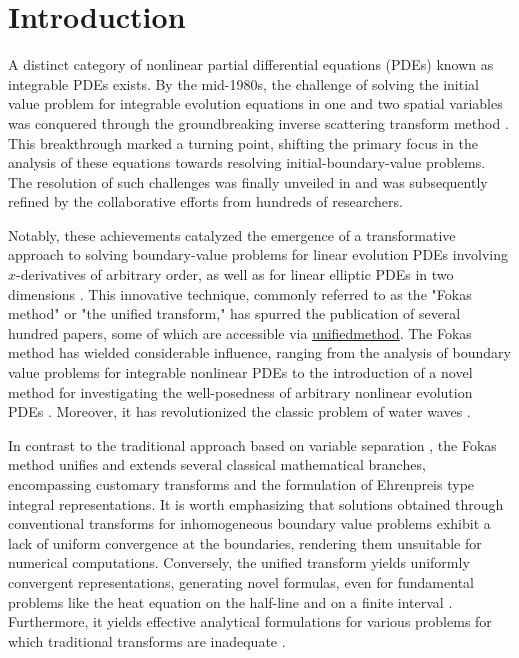 \documentclass[12pt]{article}
\numberwithin{equation}{section}
\begin{document}
\section{Introduction}
A distinct category of nonlinear partial differential equations (PDEs) known as integrable PDEs exists. By the mid-1980s, the challenge of solving the initial value problem for integrable evolution equations in one and two spatial variables was conquered through the groundbreaking inverse scattering transform method \cite{ablowitz1974inverse}. This breakthrough marked a turning point, shifting the primary focus in the analysis of these equations towards resolving initial-boundary-value problems. The resolution of such challenges was finally unveiled in \cite{fokas1997unified} and was subsequently refined by the collaborative efforts from hundreds of researchers.

Notably, these achievements catalyzed the emergence of a transformative approach to solving boundary-value problems for linear evolution PDEs involving $x$-derivatives of arbitrary order, as well as for linear elliptic PDEs in two dimensions \cite{fokas2001two,fokas2016unified}. This innovative technique, commonly referred to as the "Fokas method" or "the unified transform," has spurred the publication of several hundred papers, some of which are accessible via \href{http://www.unifiedmethod.azurewebsites.net}{unifiedmethod}. The Fokas method has wielded considerable influence, ranging from the analysis of boundary value problems for integrable nonlinear PDEs \cite{fokas2005nonlinear,spence2010new} to the introduction of a novel method for investigating the well-posedness of arbitrary nonlinear evolution PDEs \cite{fokas2017nonlinear,colbrook2019unified}. Moreover, it has revolutionized the classic problem of water waves \cite{ablowitz2006new}.

In contrast to the traditional approach based on variable separation \cite{fokas2012synthesis}, the Fokas method unifies and extends several classical mathematical branches, encompassing customary transforms and the formulation of Ehrenpreis type integral representations. It is worth emphasizing that solutions obtained through conventional transforms for inhomogeneous boundary value problems exhibit a lack of uniform convergence at the boundaries, rendering them unsuitable for numerical computations. Conversely, the unified transform yields uniformly convergent representations, generating novel formulas, even for fundamental problems like the heat equation on the half-line \cite{fokas2021unified} and on a finite interval \cite{fokas2005transform}. Furthermore, it yields effective analytical formulations for various problems for which traditional transforms are inadequate \cite{fokas2012synthesis}.
\end{document}
